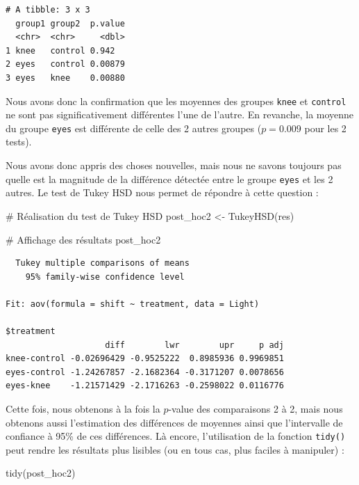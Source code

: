 \documentclass[
  a4paper,
]{article}
\newenvironment{Shaded}{\begin{snugshade}}{\end{snugshade}}
\newcommand{\CommentTok}[1]{\textcolor[rgb]{0.54,0.53,0.53}{#1}}
\newcommand{\FunctionTok}[1]{\textcolor[rgb]{0.39,0.29,0.61}{#1}}
\newcommand{\NormalTok}[1]{\textcolor[rgb]{0.12,0.11,0.11}{#1}}
\newcommand{\OtherTok}[1]{\textcolor[rgb]{0.00,0.43,0.16}{#1}}
\begin{document}
\begin{verbatim}
# A tibble: 3 x 3
  group1 group2  p.value
  <chr>  <chr>     <dbl>
1 knee   control 0.942  
2 eyes   control 0.00879
3 eyes   knee    0.00880
\end{verbatim}

Nous avons donc la confirmation que les moyennes des groupes \texttt{knee} et \texttt{control} ne sont pas significativement différentes l'une de l'autre. En revanche, la moyenne du groupe \texttt{eyes} est différente de celle des 2 autres groupes (\(p = 0.009\) pour les 2 tests).

Nous avons donc appris des choses nouvelles, mais nous ne savons toujours pas quelle est la magnitude de la différence détectée entre le groupe \texttt{eyes} et les 2 autres. Le test de Tukey HSD nous permet de répondre à cette question :

\begin{Shaded}
\begin{Highlighting}[]
\CommentTok{\# Réalisation du test de Tukey HSD}
\NormalTok{post\_hoc2 }\OtherTok{\textless{}{-}} \FunctionTok{TukeyHSD}\NormalTok{(res)}

\CommentTok{\# Affichage des résultats}
\NormalTok{post\_hoc2}
\end{Highlighting}
\end{Shaded}

\begin{verbatim}
  Tukey multiple comparisons of means
    95% family-wise confidence level

Fit: aov(formula = shift ~ treatment, data = Light)

$treatment
                    diff        lwr        upr     p adj
knee-control -0.02696429 -0.9525222  0.8985936 0.9969851
eyes-control -1.24267857 -2.1682364 -0.3171207 0.0078656
eyes-knee    -1.21571429 -2.1716263 -0.2598022 0.0116776
\end{verbatim}

Cette fois, nous obtenons à la fois la \(p\)-value des comparaisons 2 à 2, mais nous obtenons aussi l'estimation des différences de moyennes ainsi que l'intervalle de confiance à 95\% de ces différences. Là encore, l'utilisation de la fonction \texttt{tidy()} peut rendre les résultats plus lisibles (ou en tous cas, plus faciles à manipuler) :

\begin{Shaded}
\begin{Highlighting}[]
\FunctionTok{tidy}\NormalTok{(post\_hoc2)}
\end{Highlighting}
\end{Shaded}
\end{document}
